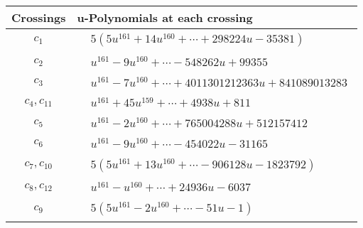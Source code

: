 \documentclass[1p]{elsarticle_modified}
\theoremstyle{definition}
\begin{document}
\begin{tabular}{m{50pt}|m{274pt}}
Crossings & \hspace{64pt}u-Polynomials at each crossing \\
\hline $$\begin{aligned}c_{1}\end{aligned}$$&$\begin{aligned}
&5(5 u^{161}+14 u^{160}+\cdots+298224 u-35381)
\end{aligned}$\\
\hline $$\begin{aligned}c_{2}\end{aligned}$$&$\begin{aligned}
&u^{161}-9 u^{160}+\cdots-548262 u+99355
\end{aligned}$\\
\hline $$\begin{aligned}c_{3}\end{aligned}$$&$\begin{aligned}
&u^{161}-7 u^{160}+\cdots+4011301212363 u+841089013283
\end{aligned}$\\
\hline $$\begin{aligned}c_{4},c_{11}\end{aligned}$$&$\begin{aligned}
&u^{161}+45 u^{159}+\cdots+4938 u+811
\end{aligned}$\\
\hline $$\begin{aligned}c_{5}\end{aligned}$$&$\begin{aligned}
&u^{161}-2 u^{160}+\cdots+765004288 u+512157412
\end{aligned}$\\
\hline $$\begin{aligned}c_{6}\end{aligned}$$&$\begin{aligned}
&u^{161}-9 u^{160}+\cdots-454022 u-31165
\end{aligned}$\\
\hline $$\begin{aligned}c_{7},c_{10}\end{aligned}$$&$\begin{aligned}
&5(5 u^{161}+13 u^{160}+\cdots-906128 u-1823792)
\end{aligned}$\\
\hline $$\begin{aligned}c_{8},c_{12}\end{aligned}$$&$\begin{aligned}
&u^{161}- u^{160}+\cdots+24936 u-6037
\end{aligned}$\\
\hline $$\begin{aligned}c_{9}\end{aligned}$$&$\begin{aligned}
&5(5 u^{161}-2 u^{160}+\cdots-51 u-1)
\end{aligned}$\\
\hline
\end{tabular}\\~\\
\end{document}
